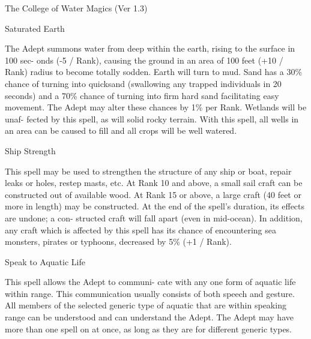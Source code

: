 \begin{Chapter}{The College of Water Magics (Ver 1.3)}
\begin{spell}[G-7]{Saturated Earth }

\begin{effects}
 The  Adept  summons  water  from  deep 
within  the  earth,  rising  to  the  surface  in  100  sec-
onds (-5 / Rank), causing the ground in an area of 
100  feet  (+10  /  Rank)  radius  to  become  totally 
sodden.  Earth  will  turn  to  mud.  Sand  has  a  30\% 
chance  of  turning  into  quicksand  (swallowing  any 
trapped  individuals  in  20  seconds)  and  a  70\% 
chance  of  turning  into  firm  hard  sand  facilitating 
easy  movement.  The  Adept  may  alter  these 
chances  by  1\%  per  Rank.  Wetlands  will  be  unaf-
fected  by  this  spell,  as  will  solid  rocky  terrain. 
With this spell, all wells in an area can be caused to 
fill and all crops will be well watered. 

\end{effects}
\end{spell}

\begin{spell}[G-8]{Ship Strength }

\begin{effects}
 This  spell  may  be  used  to  strengthen  the 
structure of any ship or boat, repair leaks or holes, 
restep  masts,  etc.  At  Rank  10  and  above,  a  small 
sail craft can be constructed out of available wood. 
At Rank 15 or above, a large craft (40 feet or more 
in  length)  may  be  constructed.  At  the  end  of  the 
spell’s  duration,  its  effects  are  undone;  a  con-
structed craft will fall apart (even in mid-ocean). In 
addition,  any  craft  which  is  affected  by  this  spell 
has its chance of encountering sea monsters, pirates 
or typhoons, decreased by 5\% (+1 / Rank). 

\end{effects}
\end{spell}

\begin{spell}[G-9]{Speak to Aquatic Life }

\begin{effects}
 This  spell  allows  the  Adept  to  communi-
cate with any one form of aquatic life within range. 
This  communication  usually  consists  of  both 
speech  and  gesture.  All  members  of  the  selected 
generic  type  of  aquatic  that  are  within  speaking 
range  can  be  understood  and  can  understand  the 
Adept. The Adept may have more than one spell on 
at  once,  as  long  as  they  are  for  different  generic 
types. 


\end{effects}
\end{spell}
\end{Chapter}
